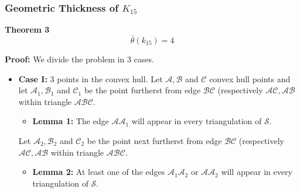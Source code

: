 \documentclass[12 pt]{beamer}
\begin{document}
\begin{frame}{}
    \frametitle{Geometric Thickness of $K_{15}$}
    
    \begin{block}{\textbf{Theorem 3}}
    $$\bar{\theta} (k_{15}) = 4 $$
    \end{block}
    
    \pause
    
    \textbf{Proof:}
    We divide the problem in $3$ cases.
    
    \begin{itemize}
    \item \textbf{Case I:} $3$ points in the convex hull. 
    Let $\mathcal{A, B}$ and $\mathcal{C}$ convex hull points and let $\mathcal{A}_{1}, \mathcal{B}_{1}$ and $\mathcal{C}_{1}$ be the point furtherst from edge $\mathcal{BC}$ (respectively $\mathcal{AC}, \mathcal{AB}$ within triangle $\mathcal{ABC}$.
        \begin{itemize}
            \item \textbf{Lemma 1:} The edge $\mathcal{AA}_{1}$ will appear in every triangulation of $\mathcal{S}$.
        \end{itemize}
    Let $\mathcal{A}_{2}, \mathcal{B}_{2}$ and $\mathcal{C}_{2}$ be the point next furtherst from edge $\mathcal{BC}$ (respectively $\mathcal{AC}, \mathcal{AB}$ within triangle $\mathcal{ABC}$.
        \begin{itemize}
            \item \textbf{Lemma 2:} At least one of the edges $\mathcal{A}_{1}\mathcal{A}_{2}$ or $\mathcal{A}\mathcal{A}_{2}$ will appear in every triangulation of $\mathcal{S}$.
        \end{itemize}
    \end{itemize}
\end{frame} 
\end{document}
